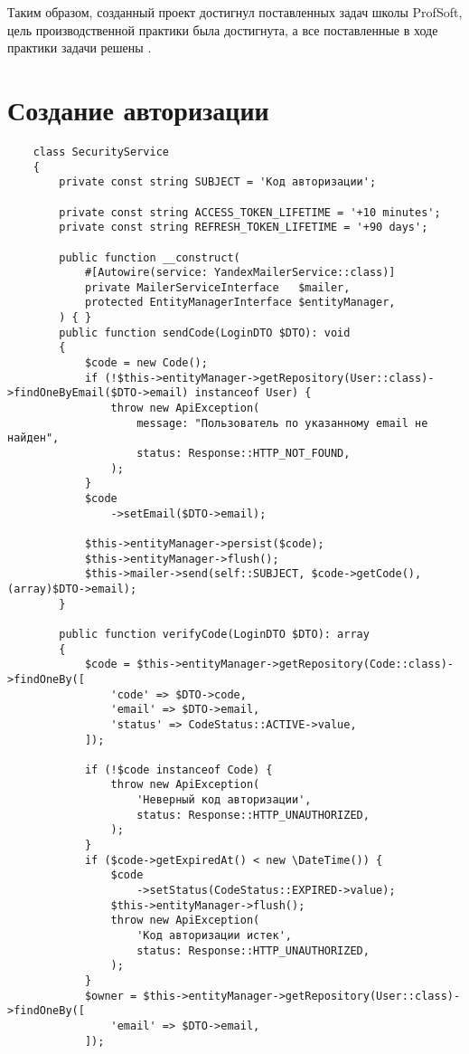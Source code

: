 \documentclass[pract]{SCWorks}
\begin{document}
Таким образом, созданный проект достигнул поставленных задач школы ProfSoft,
цель производственной практики была достигнута, а все поставленные в ходе
практики задачи решены \cite{alembic}.




\appendix

\section{Создание авторизации}

\begin{verbatim}
    class SecurityService
    {
        private const string SUBJECT = 'Код авторизации';
    
        private const string ACCESS_TOKEN_LIFETIME = '+10 minutes';
        private const string REFRESH_TOKEN_LIFETIME = '+90 days';
    
        public function __construct(
            #[Autowire(service: YandexMailerService::class)]
            private MailerServiceInterface   $mailer,
            protected EntityManagerInterface $entityManager,
        ) { }
        public function sendCode(LoginDTO $DTO): void
        {
            $code = new Code();
            if (!$this->entityManager->getRepository(User::class)->findOneByEmail($DTO->email) instanceof User) {
                throw new ApiException(
                    message: "Пользователь по указанному email не найден",
                    status: Response::HTTP_NOT_FOUND,
                );
            }
            $code
                ->setEmail($DTO->email);
    
            $this->entityManager->persist($code);
            $this->entityManager->flush();
            $this->mailer->send(self::SUBJECT, $code->getCode(), (array)$DTO->email);
        }
    
        public function verifyCode(LoginDTO $DTO): array
        {
            $code = $this->entityManager->getRepository(Code::class)->findOneBy([
                'code' => $DTO->code,
                'email' => $DTO->email,
                'status' => CodeStatus::ACTIVE->value,
            ]);
    
            if (!$code instanceof Code) {
                throw new ApiException(
                    'Неверный код авторизации',
                    status: Response::HTTP_UNAUTHORIZED,
                );
            }
            if ($code->getExpiredAt() < new \DateTime()) {
                $code
                    ->setStatus(CodeStatus::EXPIRED->value);
                $this->entityManager->flush();
                throw new ApiException(
                    'Код авторизации истек',
                    status: Response::HTTP_UNAUTHORIZED,
                );
            }
            $owner = $this->entityManager->getRepository(User::class)->findOneBy([
                'email' => $DTO->email,
            ]);
    

\end{verbatim}
\end{document}
